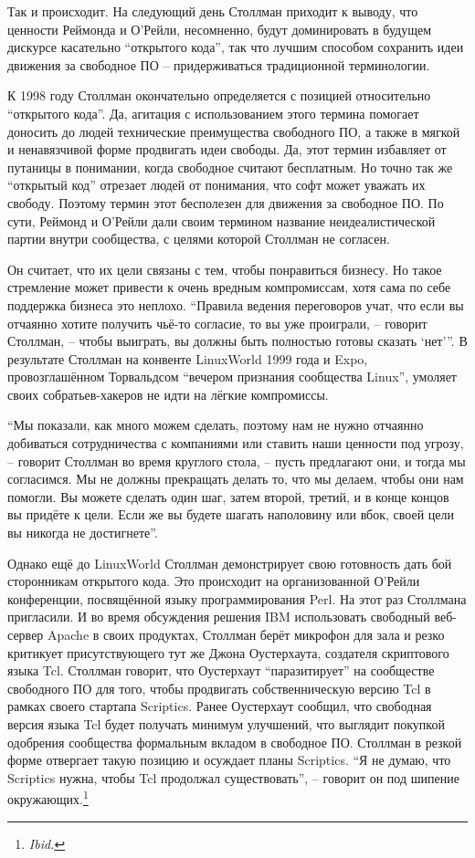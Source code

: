 Так и происходит. На следующий день Столлман приходит к выводу, что ценности Реймонда и О'Рейли, несомненно, будут доминировать в будущем дискурсе касательно \enquote{открытого кода}, так что лучшим способом сохранить идеи движения за свободное ПО -- придерживаться традиционной терминологии.

К 1998 году Столлман окончательно определяется с позицией относительно \enquote{открытого кода}. Да, агитация с использованием этого термина помогает доносить до людей технические преимущества свободного ПО, а также в мягкой и ненавязчивой форме продвигать идеи свободы. Да, этот термин избавляет от путаницы в понимании, когда свободное считают бесплатным. Но точно так же \enquote{открытый код} отрезает людей от понимания, что софт может уважать их свободу. Поэтому термин этот бесполезен для движения за свободное ПО. По сути, Реймонд и О'Рейли дали своим термином название неидеалистической партии внутри сообщества, с целями которой Столлман не согласен.

Он считает, что их цели связаны с тем, чтобы понравиться бизнесу. Но такое стремление может привести к очень вредным компромиссам, хотя сама по себе поддержка бизнеса это неплохо. \enquote{Правила ведения переговоров учат, что если вы отчаянно хотите получить чьё-то согласие, то вы уже проиграли, -- говорит Столлман, -- чтобы выиграть, вы должны быть полностью готовы сказать \enquote{нет}}. В результате Столлман на конвенте  LinuxWorld 1999 года и Expo, провозглашённом Торвальдсом \enquote{вечером признания сообщества Linux}, умоляет своих собратьев-хакеров не идти на лёгкие компромиссы.

\enquote{Мы показали, как много можем сделать, поэтому нам не нужно отчаянно добиваться сотрудничества с компаниями или ставить наши ценности под угрозу, -- говорит Столлман во время круглого стола, -- пусть предлагают они, и тогда мы согласимся. Мы не должны прекращать делать то, что мы делаем, чтобы они нам помогли. Вы можете сделать один шаг, затем второй, третий, и в конце концов вы придёте к цели. Если же вы будете шагать наполовину или вбок, своей цели вы никогда не достигнете}.

Однако ещё до LinuxWorld Столлман демонстрирует свою готовность дать бой сторонникам открытого кода. Это происходит на организованной О'Рейли конференции, посвящённой языку программирования Perl. На этот раз Столлмана пригласили. И во время обсуждения решения IBM использовать свободный веб-сервер Apache в своих продуктах, Столлман берёт микрофон для зала и резко критикует присутствующего тут же Джона Оустерхаута, создателя скриптового языка Tcl. Столлман говорит, что Оустерхаут \enquote{паразитирует} на сообществе свободного ПО для того, чтобы продвигать собственническую версию Tcl в рамках своего стартапа Scriptics. Ранее Оустерхаут сообщил, что свободная версия языка Tcl будет получать минимум улучшений, что выглядит покупкой одобрения сообщества формальным вкладом в свободное ПО. Столлман в резкой форме отвергает такую позицию и осуждает планы Scriptics. \enquote{Я не думаю, что Scriptics нужна, чтобы Tcl продолжал существовать}, -- говорит он под шипение окружающих.\footnote{\textit{Ibid.}}

